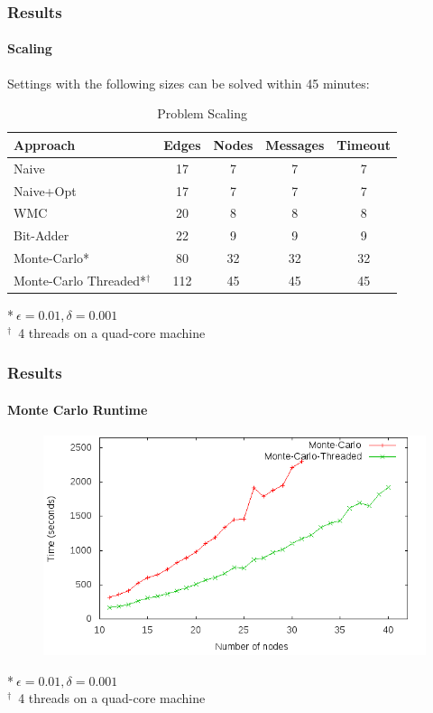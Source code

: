 \documentclass{beamer}
\begin{document}
\begin{frame}
\frametitle{Results}
\framesubtitle{Scaling}

	Settings with the following sizes can be solved within 45 minutes:

	\begin{table}
	\begin{tabular}{l | c | c | c | c}
	Approach & Edges & Nodes & Messages & Timeout\\
	\hline \hline
	Naive & 17 & 7 & 7 & 7\\
	Naive+Opt & 17 & 7 & 7 & 7\\
	WMC & 20 & 8 & 8 & 8\\
	Bit-Adder & 22 & 9 & 9 & 9\\
	Monte-Carlo* & 80 & 32 & 32 & 32\\
	Monte-Carlo Threaded*$^{\dagger}$ & 112 & 45 & 45 & 45\\
	\end{tabular}
	\caption{Problem Scaling}
	\end{table}
	*$\ \epsilon=0.01, \delta=0.001$\\
	$^{\dagger}$\ 4 threads on a quad-core machine
\end{frame}

\begin{frame}
\frametitle{Results}
\framesubtitle{Monte Carlo Runtime}
	\vspace*{-10pt}
	\begin{figure}
	\includegraphics[scale=0.5]{media/monte_carlo_runtime.png}\\
	\end{figure}
	\vspace*{-20pt}
	\tiny{*$\ \epsilon=0.01, \delta=0.001$\\
		$^{\dagger}$\ 4 threads on a quad-core machine}
\end{frame}
\end{document}
